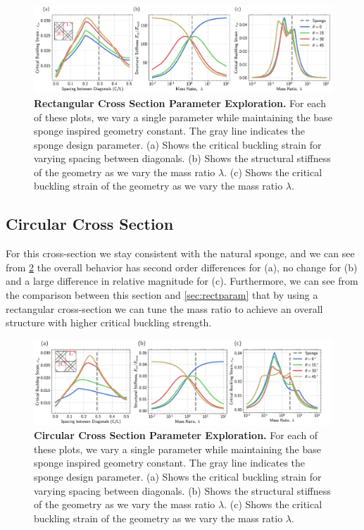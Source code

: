 \documentclass[10pt,twoside]{fernandes_supp}
\begin{document}
\begin{figure}
	\centering
	\includegraphics[width=0.9\linewidth]{SFig8.pdf}
	\caption{{\bf Rectangular Cross Section Parameter Exploration.} For each of these plots, we vary a single parameter while maintaining the base sponge inspired geometry constant. The gray line indicates the sponge design parameter. (a) Shows the critical buckling strain for varying spacing between diagonals. (b) Shows the structural stiffness of the geometry as we vary the mass ratio $\lambda$. (c) Shows the critical buckling strain of the geometry as we vary the mass ratio $\lambda$.}
	\label{SquareCrossSectionParameter}
\end{figure}

\subsection{Circular Cross Section}
For this cross-section we stay consistent with the natural sponge, and we can see from \cref{CircularCrossSectionParameter} the overall behavior has second order differences for (a), no change for (b) and a large difference in relative magnitude for (c).  Furthermore, we can see from the comparison between this section and \cref{sec:rectparam} that by using a rectangular cross-section we can tune the mass ratio to achieve an overall structure with higher critical buckling strength. 

\begin{figure}
	\centering
	\includegraphics[width=0.9\linewidth]{SFig9.pdf}
	\caption{{\bf Circular Cross Section Parameter Exploration.} For each of these plots, we vary a single parameter while maintaining the base sponge inspired geometry constant. The gray line indicates the sponge design parameter. (a) Shows the critical buckling strain for varying spacing between diagonals. (b) Shows the structural stiffness of the geometry as we vary the mass ratio $\lambda$. (c) Shows the critical buckling strain of the geometry as we vary the mass ratio $\lambda$.}
	\label{CircularCrossSectionParameter}
\end{figure}
\end{document}

